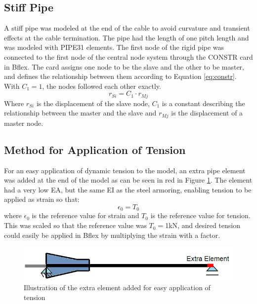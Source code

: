 \subsection{Stiff Pipe}
A stiff pipe was modeled at the end of the cable to avoid curvature and transient effects at the cable termination. The pipe had the length of one pitch length and was modeled with PIPE31 elements. The first node of the rigid pipe was connected to the first node of the central node system through the CONSTR card in Bflex. The card assigns one node to be the slave and the other to be master, and defines the relationship between them according to Equation \ref{eq:constr}. With $C_1=1$, the nodes followed each other exactly. 
\begin{equation}
r_{Si}=C_1 \cdot r_{Mj}   
\label{eq:constr} 
\end{equation}
Where $r_{Si}$ is the displacement of the slave node,  $C_1$ is a constant describing the relationship between the master and the slave and $r_{Mj}$ is the displacement of a master node.\newline 
\newline 
\subsection{Method for Application of Tension}
\noindent For an easy application of dynamic tension to the model, an extra pipe element was added at the end of the model as can be seen in red in Figure \ref{fig:exelem}. The element had a very low EA, but the same EI as the steel armoring, enabling tension to be applied as strain so that:
\begin{equation}
    \epsilon_0 = T_0
\end{equation}
where $\epsilon_0$ is the reference value for strain and $T_0$ is the reference value for tension. This was scaled so that the reference value was $T_0=$1kN, and desired tension could easily be applied in Bflex by multiplying the strain with a factor. 
\begin{figure}[H]
\centering
\includegraphics[scale=0.8]{figures/exelem}
\caption[$\; \:$Illustration of the extra element added for easy application of tension]{Illustration of the extra element added for easy application of tension}
 \label{fig:exelem}
\end{figure}


